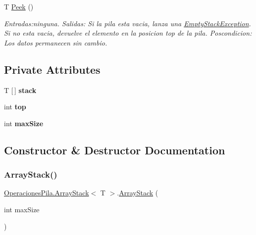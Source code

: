 \begin{DoxyCompactItemize}
T \hyperlink{class_operaciones_pila_1_1_array_stack_ac0b80f6ed3ef56c01e9fd4c847504444}{Peek} ()
\begin{DoxyCompactList}\small\item\em Entradas\+:ninguna. Salidas\+: Si la pila esta vacia, lanza una \hyperlink{class_operaciones_pila_1_1_empty_stack_exception}{Empty\+Stack\+Exception}. Si no esta vacia, devuelve el elemento en la posicion top de la pila. Poscondicion\+: Los datos permanecen sin cambio. \end{DoxyCompactList}\end{DoxyCompactItemize}
\subsection*{Private Attributes}
\begin{DoxyCompactItemize}
\item 
\mbox{\label{class_operaciones_pila_1_1_array_stack_af3e83c01e1e9acb877368f2c84f7b2af}} 
T \mbox{[}$\,$\mbox{]} {\bfseries stack}
\item 
\mbox{\label{class_operaciones_pila_1_1_array_stack_a2fdd9c8be1b81c13ca35da135cbec7be}} 
int {\bfseries top}
\item 
\mbox{\label{class_operaciones_pila_1_1_array_stack_ae90b2997e9685d9de9300746947b6b96}} 
int {\bfseries max\+Size}
\end{DoxyCompactItemize}


\subsection{Constructor \& Destructor Documentation}
\mbox{\label{class_operaciones_pila_1_1_array_stack_a71fa2281672474bbef92556bf944a176}} 
\subsubsection{\texorpdfstring{Array\+Stack()}{ArrayStack()}}
{\footnotesize\ttfamily \hyperlink{class_operaciones_pila_1_1_array_stack}{Operaciones\+Pila.\+Array\+Stack}$<$ T $>$.\hyperlink{class_operaciones_pila_1_1_array_stack}{Array\+Stack} (\begin{DoxyParamCaption}\item[{int}]{max\+Size }\end{DoxyParamCaption})\hspace{0.3cm}{\ttfamily [inline]}}



